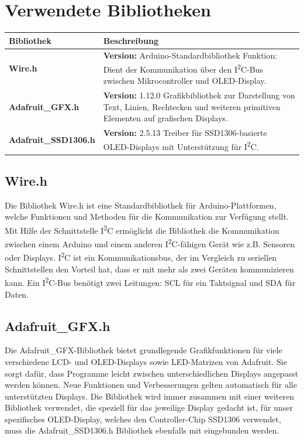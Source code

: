 \section{Verwendete Bibliotheken}
\begin{center}
	\label{tab:oled_libs}
	\begin{tabular}{|p{5cm}|p{9cm}|}
			\hline
			\textbf{Bibliothek} & \textbf{Beschreibung} \\
			\hline
			\textbf{Wire.h} &  \textbf{Version:} Arduino-Standardbibliothek \newline
			Funktion: Dient der Kommunikation über den I\textsuperscript{2}C-Bus zwischen Mikrocontroller und OLED-Display. \\
			\hline
			\textbf{Adafruit\_GFX.h} & \textbf{Version:} 1.12.0 \newline
			Grafikbibliothek zur Darstellung von Text, Linien, Rechtecken und weiteren primitiven Elementen auf grafischen Displays. \\
			\hline
			\textbf{Adafruit\_SSD1306.h} & \textbf{Version:} 2.5.13 \newline
			Treiber für SSD1306-basierte OLED-Displays mit Unterstützung für I\textsuperscript{2}C. \\
			\hline
		\end{tabular}
\end{center}

\subsection{Wire.h}
Die Bibliothek Wire.h ist eine Standardbibliothek für Arduino-Plattformen, welche Funktionen und Methoden für die Kommunikation zur Verfügung stellt. Mit Hilfe der Schnittstelle I\textsuperscript{2}C ermöglicht die Bibliothek die Kommunikation zwischen einem Arduino und einem anderen I\textsuperscript{2}C-fähigen Gerät wie z.B. Sensoren oder Displays. I\textsuperscript{2}C ist ein Kommunikationsbus, der im Vergleich zu seriellen Schnittstellen den Vorteil hat, dass er mit mehr als zwei Geräten kommunizieren kann. Ein I\textsuperscript{2}C-Bus benötigt zwei Leitungen: SCL für ein Taktsignal und SDA für Daten.

\subsection{Adafruit\_GFX.h}
Die Adafruit\_GFX-Bibliothek bietet grundlegende Grafikfunktionen für viele verschiedene LCD- und OLED-Displays sowie LED-Matrizen von Adafruit. Sie sorgt dafür, dass Programme leicht zwischen unterschiedlichen Displays angepasst werden können. Neue Funktionen und Verbesserungen gelten automatisch für alle unterstützten Displays.
Die Bibliothek wird immer zusammen mit einer weiteren Bibliothek verwendet, die speziell für das jeweilige Display gedacht ist, für unser spezifisches OLED-Display, welches den Controller-Chip SSD1306 verwendet, muss die Adafruit\_SSD1306.h Bibliothek ebenfalls mit eingebunden werden.

